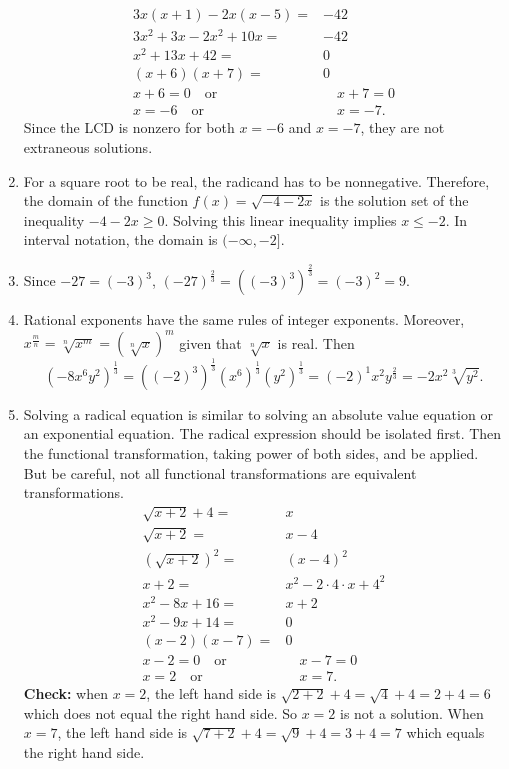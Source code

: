 \documentclass[
  12pt]{article}
\begin{document}
\begin{enumerate}
\[\begin{aligned}
   3x(x+1)-2x(x-5)=&-42\\
   3x^2+3x-2x^2+10x=&-42\\
   x^2+13x+42=&0\\
   (x+6)(x+7)=&0\\
   x+6=0\quad\text{or}&\quad x+7=0\\
   x=-6\quad\text{or}&\quad x=-7.
   \end{aligned}
   \] Since the LCD is nonzero for both \(x=-6\) and \(x=-7\), they are
  not extraneous solutions.
\item
  For a square root to be real, the radicand has to be nonnegative.
  Therefore, the domain of the function \(f(x)=\sqrt{-4-2x}\) is the
  solution set of the inequality \(-4-2x\ge 0\). Solving this linear
  inequality implies \(x\le -2\). In interval notation, the domain is
  \((-\infty, -2]\).
\item
  Since \(-27=(-3)^3\), \((-27)^{\frac23}=((-3)^3)^{\frac23}=(-3)^2=9\).
\item
  Rational exponents have the same rules of integer exponents. Moreover,
  \(x^{\frac mn}=\sqrt[n]{x^m}=(\sqrt[n]{x})^m\) given that
  \(\sqrt[n]x\) is real. Then \[
  (-8x^6y^2)^{\frac13}=((-2)^3)^{\frac13}(x^6)^{\frac13}(y^2)^{\frac13}=(-2)^1x^2y^{\frac23}=-2x^2\sqrt[3]{y^2}.
  \]
\item
  Solving a radical equation is similar to solving an absolute value
  equation or an exponential equation. The radical expression should be
  isolated first. Then the functional transformation, taking power of
  both sides, and be applied. But be careful, not all functional
  transformations are equivalent transformations. \[
  \begin{aligned}
  \sqrt{x+2}+4=&x\\
  \sqrt{x+2}=&x-4\\
  (\sqrt{x+2})^2=&(x-4)^2\\
  x+2=&x^2-2\cdot 4\cdot x+4^2\\
  x^2-8x+16=&x+2\\
  x^2-9x+14=&0\\
  (x-2)(x-7)=&0\\
  x-2=0\quad\text{or}&\quad x-7=0\\
  x=2\quad\text{or}&\quad x=7.
  \end{aligned}
  \] \textbf{Check:} when \(x=2\), the left hand side is
  \(\sqrt{2+2}+4=\sqrt{4}+4=2+4=6\) which does not equal the right hand
  side. So \(x=2\) is not a solution. When \(x=7\), the left hand side
  is \(\sqrt{7+2}+4=\sqrt{9}+4=3+4=7\) which equals the right hand side.

\end{enumerate}
\end{document}
